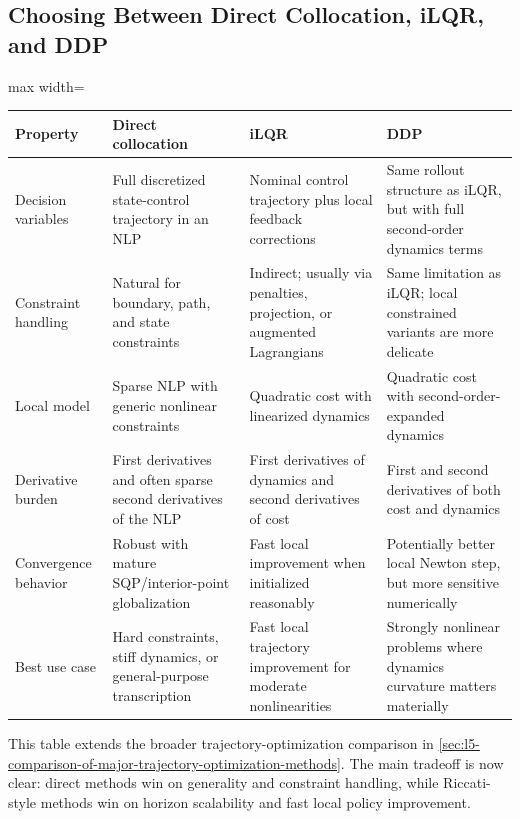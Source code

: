 \subsection{Choosing Between Direct Collocation, iLQR, and DDP}
\label{sec:l8-choosing-between-direct-collocation-ilqr-and-ddp}

\begin{center}
	\small
	\begin{adjustbox}{max width=\textwidth}
	\begin{tabular}{p{}p{}p{}p{}}
		\toprule
		Property & Direct collocation & iLQR & DDP \\
		\midrule
		Decision variables & Full discretized state-control trajectory in an NLP & Nominal control trajectory plus local feedback corrections & Same rollout structure as iLQR, but with full second-order dynamics terms \\
		Constraint handling & Natural for boundary, path, and state constraints & Indirect; usually via penalties, projection, or augmented Lagrangians & Same limitation as iLQR; local constrained variants are more delicate \\
		Local model & Sparse NLP with generic nonlinear constraints & Quadratic cost with linearized dynamics & Quadratic cost with second-order-expanded dynamics \\
		Derivative burden & First derivatives and often sparse second derivatives of the NLP & First derivatives of dynamics and second derivatives of cost & First and second derivatives of both cost and dynamics \\
		Convergence behavior & Robust with mature SQP/interior-point globalization & Fast local improvement when initialized reasonably & Potentially better local Newton step, but more sensitive numerically \\
		Best use case & Hard constraints, stiff dynamics, or general-purpose transcription & Fast local trajectory improvement for moderate nonlinearities & Strongly nonlinear problems where dynamics curvature matters materially \\
		\bottomrule
	\end{tabular}
	\end{adjustbox}
\end{center}

\begin{remark}
	This table extends the broader trajectory-optimization comparison in \autoref{sec:l5-comparison-of-major-trajectory-optimization-methods}. The main tradeoff is now clear: direct methods win on generality and constraint handling, while Riccati-style methods win on horizon scalability and fast local policy improvement.
\end{remark}
